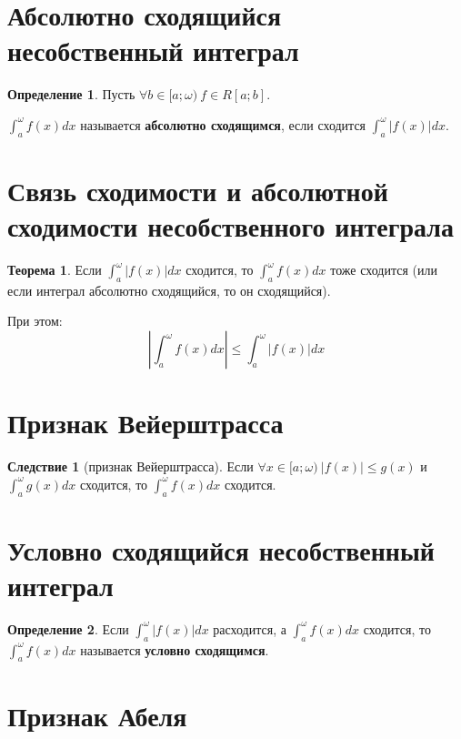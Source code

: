 \documentclass{report}
\theoremstyle{definition}
\newtheorem*{definition}{Определение}
\newtheorem*{effect}{Следствие}
\newtheorem*{theorem}{Теорема}
\begin{document}
\section{Абсолютно сходящийся несобственный интеграл}

\begin{definition}
    Пусть $\forall b \in [a;\omega) \ f\in R[a;b]$.

    $\int_{a}^{\omega}f(x)dx$ называется \textbf{абсолютно сходящимся}, если сходится $\int_{a}^{\omega}|f(x)|dx$.
\end{definition}

\section{Связь сходимости и абсолютной сходимости несобственного интеграла}

\begin{theorem}
    Если $\int_{a}^{\omega}| f(x) |dx$ сходится, то $\int_{a}^{\omega}f(x)dx$ тоже сходится (или если интеграл
    абсолютно сходящийся, то он сходящийся).

    При этом:
    \begin{equation*}
        | \int_{a}^{\omega}f(x)dx | \leqslant \int_{a}^{\omega}| f(x) |dx
    \end{equation*}
\end{theorem}

\section{Признак Вейерштрасса}

\begin{effect}[признак Вейерштрасса]
    Если $\forall x \in [a;\omega) \ | f(x) | \leqslant g(x)$ и $\int_{a}^{\omega}g(x)dx$ сходится, то
    $\int_{a}^{\omega}f(x)dx$ сходится.
\end{effect}

\section{Условно сходящийся несобственный интеграл}

\begin{definition}
    Если $\int_{a}^{\omega}| f(x) |dx$ расходится, а $\int_{a}^{\omega}f(x)dx$ сходится, то $\int_{a}^{\omega}f(x)dx$
    называется \textbf{условно сходящимся}.
\end{definition}

\section{Признак Абеля}
\end{document}
